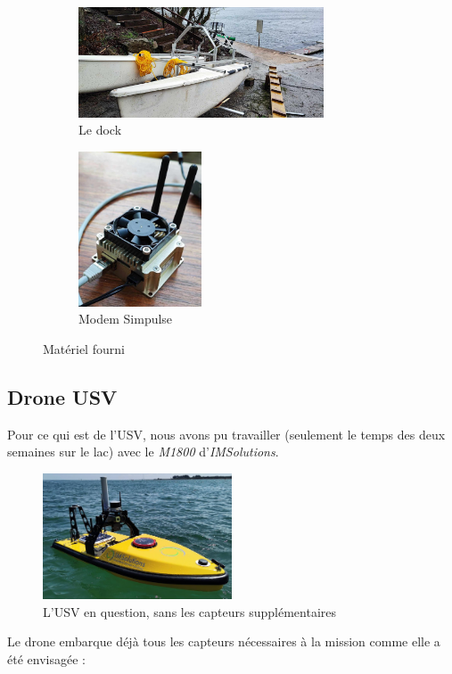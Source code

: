 \documentclass[12pt]{report}
\begin{document}
\begin{figure}[H]
    \begin{subfigure}{0.45\textwidth}
        \centering
        \includegraphics[width=0.8\textwidth]{imgs/dock.jpg}
        \caption{Le dock}
        \label{fig:dock}
    \end{subfigure}
    \begin{subfigure}{0.4\textwidth}
        \centering
        \includegraphics[width=0.4\textwidth]{imgs/simpulse.jpg}
        \caption{Modem Simpulse}
        \label{fig:simpulse}
    \end{subfigure}
    \caption{Matériel fourni}
\end{figure}

\subsection{Drone USV}
Pour ce qui est de l'USV, nous avons pu travailler (seulement le temps des deux semaines sur le lac) avec le \textit{M1800} d'\textit{IMSolutions}.
\begin{figure}[H]
    \centering
    \includegraphics[width=0.5\textwidth]{imgs/monodrone-1800-chenal.jpg}
    \caption{L'USV en question, sans les capteurs supplémentaires}
\end{figure}
Le drone embarque déjà tous les capteurs nécessaires à la mission comme elle a été envisagée :
\end{document}
